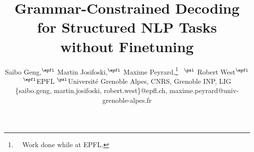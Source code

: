 \documentclass[11pt]{article}
\title{Grammar-Constrained Decoding for Structured NLP Tasks\\without Finetuning}
\author{
Saibo Geng,$^{\epfl}$
Martin Josifoski,$^{\epfl}$
Maxime Peyrard,\thanks{~~Work done while at EPFL.}~
$^{\psl}$
Robert West$^{\epfl}$ \\
$^{\epfl}$EPFL
$^{\psl}$Universit\'e Grenoble Alpes, CNRS, Grenoble INP, LIG \\
{\{saibo.geng, martin.josifoski, robert.west\}@epfl.ch},
{maxime.peyrard@univ-grenoble-alpes.fr}
}
\begin{document}
\maketitle




\begin{abstract}

\end{abstract}







%

%







\clearpage

\appendix

%























\end{document}
